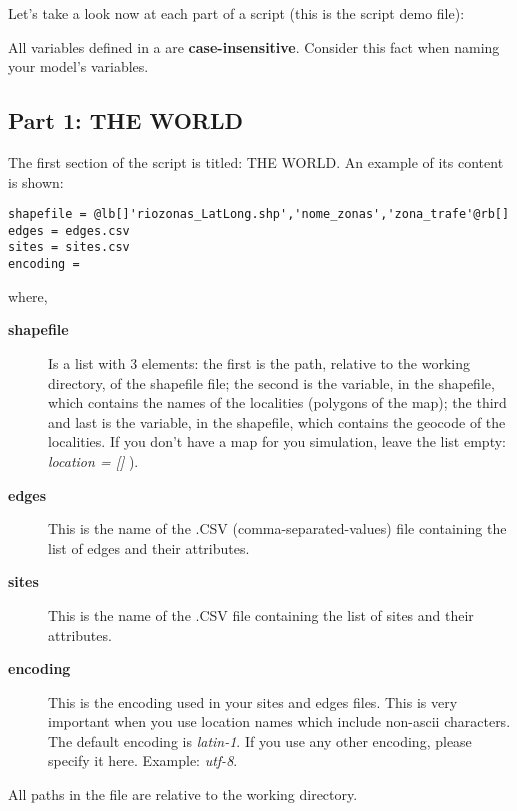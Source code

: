 \documentclass[a4paper,10pt]{manual}
\begin{document}
Let's take a look now at each part of a script (this is the script   demo file):

\begin{notice}[warning]
All variables defined in a  are \textbf{case-insensitive}. Consider this fact when naming your model's variables.
\end{notice}


\subsection{Part 1: THE WORLD}

The first section of the script is titled: THE WORLD. An example of its content is shown:

\begin{Verbatim}[commandchars=@\[\]]
shapefile = @lb[]'riozonas_LatLong.shp','nome_zonas','zona_trafe'@rb[]
edges = edges.csv
sites = sites.csv
encoding =
\end{Verbatim}

where,
\begin{description}
\item[\textbf{shapefile}]
Is a list with 3 elements: the first is  the path, relative to the working directory, of the shapefile file; the second  is the variable, in the shapefile, which contains the names of the localities (polygons of the map); the third and last is the variable, in the shapefile, which contains the geocode of the localities. If you don't have a map for you simulation, leave the list empty: \emph{location = {[}{]}} ).

\item[\textbf{edges}]
This is the name of the .CSV (comma-separated-values) file containing the list of edges and their attributes.

\item[\textbf{sites}]
This is the name of the .CSV file containing the list of sites and their attributes.

\item[\textbf{encoding}]
This is the encoding used in your sites and edges files. This is very important when you use location names which include non-ascii characters. The default encoding is \emph{latin-1}. If you use any other encoding, please specify it here. Example: \emph{utf-8}.

\end{description}

\begin{notice}[note]
All paths in the  file are relative to the working directory.
\end{notice}
\end{document}
